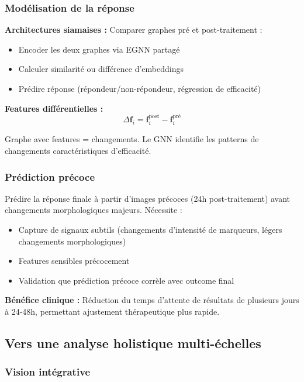\subsubsection{Modélisation de la réponse}

\textbf{Architectures siamaises :}
Comparer graphes pré et post-traitement :
\begin{itemize}
    \item Encoder les deux graphes via EGNN partagé
    \item Calculer similarité ou différence d'embeddings
    \item Prédire réponse (répondeur/non-répondeur, régression de efficacité)
\end{itemize}

\textbf{Features différentielles :}
\[
\Delta \mathbf{f}_i = \mathbf{f}_i^{\text{post}} - \mathbf{f}_i^{\text{pré}}
\]

Graphe avec features = changements. Le GNN identifie les patterns de changements caractéristiques d'efficacité.

\subsubsection{Prédiction précoce}

Prédire la réponse finale à partir d'images précoces (24h post-traitement) avant changements morphologiques majeurs. Nécessite :
\begin{itemize}
    \item Capture de signaux subtils (changements d'intensité de marqueurs, légers changements morphologiques)
    \item Features sensibles précocement
    \item Validation que prédiction précoce corrèle avec outcome final
\end{itemize}

\textbf{Bénéfice clinique :}
Réduction du temps d'attente de résultats de plusieurs jours à 24-48h, permettant ajustement thérapeutique plus rapide.

\subsection{Vers une analyse holistique multi-échelles}

\subsubsection{Vision intégrative}

